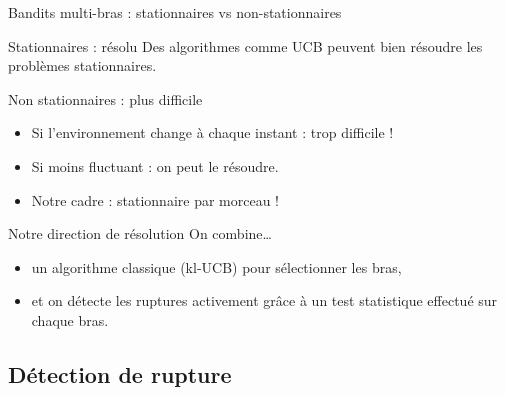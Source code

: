 \documentclass[11pt,french,ignorenonframetext,]{beamer}
\begin{document}
\begin{frame}{Bandits multi-bras : stationnaires vs non-stationnaires}

  \begin{block}{Stationnaires : résolu}
    Des algorithmes comme UCB peuvent bien résoudre les problèmes stationnaires.
  \end{block}

  \pause

  \begin{alertblock}{Non stationnaires : plus difficile}
    \begin{itemize}
      \item Si l'environnement change à chaque instant : trop difficile !
      \item Si moins fluctuant : on peut le résoudre.
      \item Notre cadre : stationnaire par morceau !
    \end{itemize}
  \end{alertblock}

  \pause

  \begin{block}{Notre direction de résolution}
    On combine\ldots{}
    \begin{itemize}
      \item un \alert{algorithme classique} (kl-UCB) pour sélectionner les bras,
      \item et \alert{on détecte les ruptures activement grâce à un test statistique} effectué sur chaque bras.
    \end{itemize}
  \end{block}

\end{frame}


\subsection{\hfill{}Détection de rupture\hfill{}}
\end{document}
